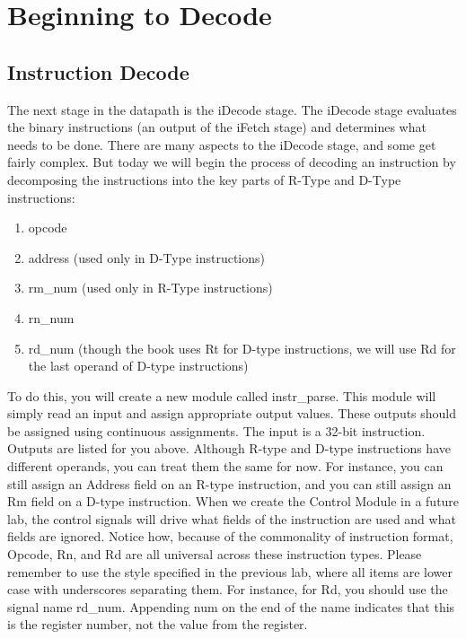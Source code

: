 \chapter{Beginning to Decode}

\section{Instruction Decode}

The next stage in the datapath is the iDecode stage.  The iDecode stage evaluates the binary instructions (an output of the iFetch stage) and determines what needs to be done.  There are many aspects to the iDecode stage, and some get fairly complex.  But today we will begin the process of decoding an instruction by decomposing the instructions into the key parts of R-Type and D-Type instructions:
\begin{enumerate}
	\item opcode
	\item address (used only in D-Type instructions)
	\item rm\_num (used only in R-Type instructions)
	\item rn\_num
	\item rd\_num (though the book uses Rt for D-type instructions, we will use Rd for the last operand of D-type instructions)
\end{enumerate}   

To do this, you will create a new module called instr\_parse.  This module will simply read an input and assign appropriate output values.  These outputs should be assigned using continuous assignments.  The input is a 32-bit instruction.  Outputs are listed for you above.  Although R-type and D-type instructions have different operands, you can treat them the same for now.  For instance, you can still assign an Address field on an R-type instruction, and you can still assign an Rm field on a D-type instruction.  When we create the Control Module in a future lab, the control signals will drive what fields of the instruction are used and what fields are ignored.  Notice how, because of the commonality of instruction format, Opcode, Rn, and Rd are all universal across these instruction types.  Please remember to use the style specified in the previous lab, where all items are lower case with underscores separating them.  For instance, for Rd, you should use the signal name rd\_num.  Appending num on the end of the name indicates that this is the register number, not the value from the register.

